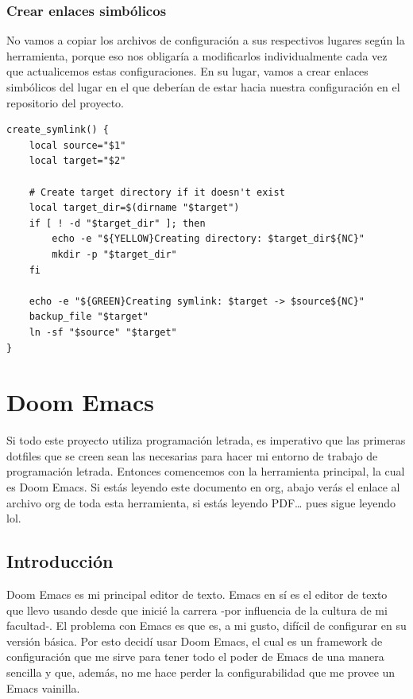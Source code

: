 \documentclass[11pt]{article}
\begin{document}
\subsubsection{Crear enlaces simbólicos}
\label{sec:orgaeb72f5}

No vamos a copiar los archivos de configuración a sus respectivos lugares según la herramienta, porque eso nos obligaría a modificarlos individualmente cada vez que actualicemos estas configuraciones. En su lugar, vamos a crear enlaces simbólicos del lugar en el que deberían de estar hacia nuestra configuración en el repositorio del proyecto.

\begin{verbatim}
create_symlink() {
    local source="$1"
    local target="$2"

    # Create target directory if it doesn't exist
    local target_dir=$(dirname "$target")
    if [ ! -d "$target_dir" ]; then
        echo -e "${YELLOW}Creating directory: $target_dir${NC}"
        mkdir -p "$target_dir"
    fi

    echo -e "${GREEN}Creating symlink: $target -> $source${NC}"
    backup_file "$target"
    ln -sf "$source" "$target"
}
\end{verbatim}
\section{Doom Emacs}
\label{sec:org56c0fa9}

Si todo este proyecto utiliza programación letrada, es imperativo que las primeras dotfiles que se creen sean las necesarias para hacer mi entorno de trabajo de programación letrada. Entonces comencemos con la herramienta principal, la cual es Doom Emacs. Si estás leyendo este documento en org, abajo verás el enlace al archivo org de toda esta herramienta, si estás leyendo PDF\ldots{} pues sigue leyendo lol.
\subsection{Introducción}
\label{sec:org474f332}
Doom Emacs es mi principal editor de texto. Emacs en sí es el editor de texto que llevo usando desde que inicié la carrera -por influencia de la cultura de mi facultad-. El problema con Emacs es que es, a mi gusto, difícil de configurar en su versión básica. Por esto decidí usar Doom Emacs, el cual es un framework de configuración que me sirve para tener todo el poder de Emacs de una manera sencilla y que, además, no me hace perder la configurabilidad que me provee un Emacs vainilla.
\end{document}
